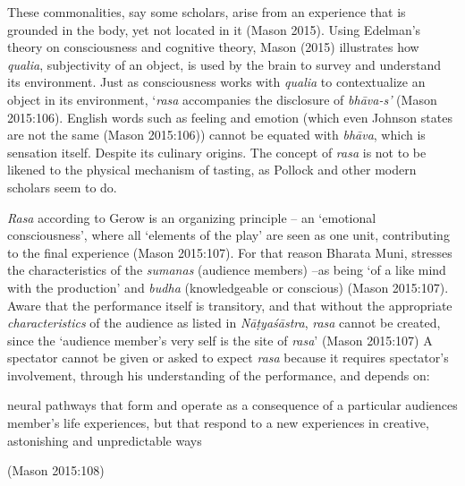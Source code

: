 These commonalities, say some scholars, arise from an experience that is grounded in the body, yet not located in it (Mason 2015). Using Edelman’s theory on consciousness and cognitive theory, Mason (2015) illustrates how \textsl{qualia}, subjectivity of an object, is used by the brain to survey and understand its environment. Just as consciousness works with \textsl{qualia} to contextualize an object in its environment, ‘\textsl{rasa} accompanies the disclosure of \textsl{bhāva-s’} (Mason 2015:106). English words such as feeling and emotion (which even Johnson states are not the same (Mason 2015:106)) cannot be equated with \textsl{bhāva}, which is sensation itself. Despite its culinary origins. The concept of \textsl{rasa} is not to be likened to the physical mechanism of tasting, as Pollock and other modern scholars seem to do.

\textsl{Rasa} according to Gerow is an organizing principle -- an ‘emotional consciousness’, where all ‘elements of the play’ are seen as one unit, contributing to the final experience (Mason 2015:107). For that reason Bharata Muni, stresses the characteristics of the \textsl{sumanas} (audience members) –as being ‘of a like mind with the production’ and \textsl{budha} (knowledgeable or conscious) (Mason 2015:107). Aware that the performance itself is transitory, and that without the appropriate \textsl{characteristics} of the audience as listed in \textsl{Nāṭyaśāstra}, \textsl{rasa} cannot be created, since the ‘audience member’s very self is the site of \textsl{rasa}’ (Mason 2015:107) A spectator cannot be given or asked to expect \textsl{rasa} because it requires spectator’s involvement, through his understanding of the performance, and depends on:

\begin{myquote}
neural pathways that form and operate as a consequence of a particular audiences member’s life experiences, but that respond to a new experiences in creative, astonishing and unpredictable ways 

\hfill (Mason 2015:108) 
\end{myquote}

